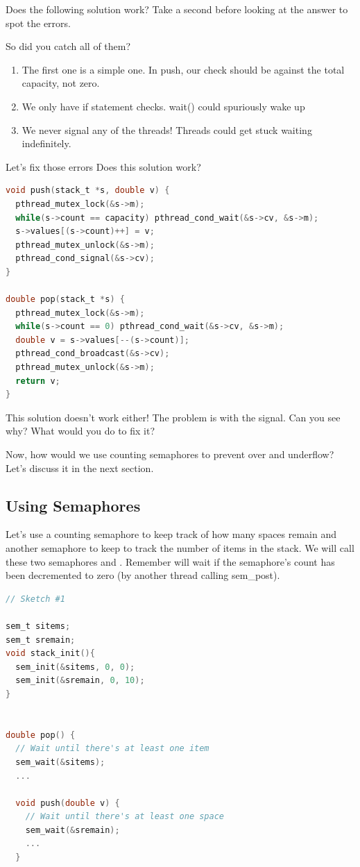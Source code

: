 Does the following solution work?
Take a second before looking at the answer to spot the errors.

So did you catch all of them?
\begin{enumerate}
\item The first one is a simple one. In push, our check should be against the total capacity, not zero.
\item We only have if statement checks. wait() could spuriously wake up
\item We never signal any of the threads! Threads could get stuck waiting indefinitely.
\end{enumerate}

Let's fix those errors
Does this solution work?

\begin{lstlisting}[language=C]
void push(stack_t *s, double v) {
  pthread_mutex_lock(&s->m);
  while(s->count == capacity) pthread_cond_wait(&s->cv, &s->m);
  s->values[(s->count)++] = v;
  pthread_mutex_unlock(&s->m);
  pthread_cond_signal(&s->cv);
}

double pop(stack_t *s) {
  pthread_mutex_lock(&s->m);
  while(s->count == 0) pthread_cond_wait(&s->cv, &s->m);
  double v = s->values[--(s->count)];
  pthread_cond_broadcast(&s->cv);
  pthread_mutex_unlock(&s->m);
  return v;
}
\end{lstlisting}

This solution doesn't work either!
The problem is with the signal.
Can you see why? What would you do to fix it?

Now, how would we use counting semaphores to prevent over and underflow?
Let's discuss it in the next section.

\subsection{Using Semaphores}

Let's use a counting semaphore to keep track of how many spaces remain and another semaphore to keep to track the number of items in the stack.
We will call these two semaphores  and .
Remember  will wait if the semaphore's count has been decremented to zero (by another thread calling sem\_post).

\begin{lstlisting}[language=C]
// Sketch #1

sem_t sitems;
sem_t sremain;
void stack_init(){
  sem_init(&sitems, 0, 0);
  sem_init(&sremain, 0, 10);
}


double pop() {
  // Wait until there's at least one item
  sem_wait(&sitems);
  ...

  void push(double v) {
    // Wait until there's at least one space
    sem_wait(&sremain);
    ...
  }
\end{lstlisting}

